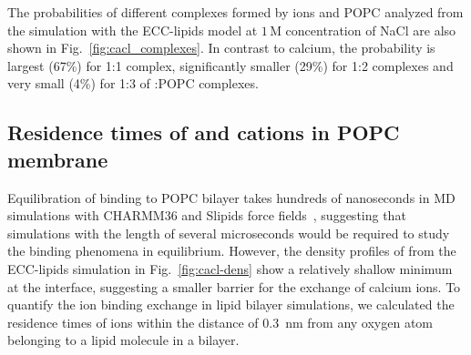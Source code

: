 \documentclass[aip,jcp,twocolumn]{revtex4}
\begin{document}
The probabilities of different complexes formed by  ions and POPC
analyzed from the simulation with the ECC-lipids model at $1\,$M concentration of NaCl are also 
shown in Fig.~\ref{fig:cacl_complexes}. In contrast to calcium, the
probability is largest (67\%) for 1:1 complex, significantly smaller (29\%)
for 1:2 complexes and very small (4\%) for 1:3 of :POPC complexes.




\subsection{Residence times of  and  cations in POPC membrane}

Equilibration of  binding to POPC bilayer takes hundreds of
nanoseconds in MD simulations with CHARMM36 and Slipids force fields~\cite{javanainen17}, suggesting that
simulations with the length of several microseconds would be required
to study the binding phenomena in equilibrium. However, the density profiles of 
from the ECC-lipids simulation in Fig.~\ref{fig:cacl-dens} show a relatively shallow
minimum at the interface, suggesting a smaller barrier for the exchange of calcium ions.
To quantify the ion binding exchange in lipid bilayer simulations, we calculated 
the residence times of ions within the distance of 0.3~nm from any oxygen atom
belonging to a lipid molecule in a bilayer.
\end{document}
